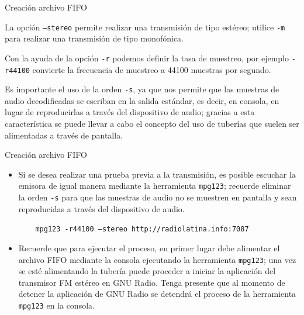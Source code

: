 \begin{frame}{Creación archivo FIFO}

La opción \texttt{--stereo} permite realizar una transmisión de tipo estéreo; utilice \texttt{-m} para realizar una transmisión de tipo monofónica.\vspace{2mm}

Con la ayuda de la opción \texttt{-r} podemos definir la tasa de muestreo, por ejemplo \texttt{-r44100} convierte la frecuencia de muestreo a 44100 muestras por segundo. \vspace{2mm}

Es importante el uso de la orden \texttt{-s}, ya que nos permite que las muestras de audio decodificadas se escriban en la salida estándar, es decir, en consola, en lugar de reproducirlas a través del dispositivo de audio; gracias a esta característica se puede llevar a cabo el concepto del uso de tuberías que suelen ser alimentadas a través de pantalla.

\end{frame}

\begin{frame}{Creación archivo FIFO}

\begin{itemize}
    \item {Si se desea realizar una prueba previa a la transmisión, es posible escuchar la emisora de igual manera mediante la herramienta \texttt{mpg123}; recuerde eliminar la orden \texttt{-s} para que las muestras de audio no se muestren en pantalla y sean reproducidas a través del dispositivo de audio\cite{wikiopendigital}.
    
    \begin{block}{}
    \texttt{
    \ \ \ mpg123 -r44100 --stereo  http://radiolatina.info:7087}
    \end{block}
    }
    
    \item {Recuerde que para ejecutar el proceso, en primer lugar debe alimentar el archivo FIFO mediante la consola ejecutando la herramienta \texttt{mpg123}; una vez se esté alimentando la tubería puede proceder a iniciar la aplicación del transmisor FM estéreo en GNU Radio. Tenga presente que al momento de detener la aplicación de GNU Radio se detendrá el proceso de la herramienta \texttt{mpg123} en la consola.}
\end{itemize}
\end{frame}

